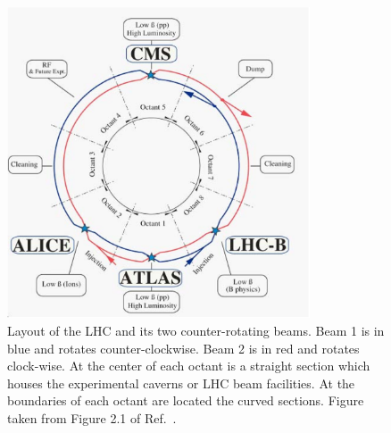 \begin{figure}[!htb]
    \begin{center}
        \includegraphics[width=0.8\textwidth]{figures/chapter2/lhc_layout}
        \caption{
            Layout of the LHC and its two counter-rotating beams. Beam 1 is in blue and rotates
            counter-clockwise. Beam 2 is in red and rotates clock-wise.
            At the center of each octant is a straight section which houses
            the experimental caverns or LHC beam facilities.
            At the boundaries of each octant are located the curved sections.
            Figure taken from Figure 2.1 of Ref.~\cite{LHCMachine}.%
        }
        \label{fig:lhc_layout}
    \end{center}
\end{figure}

